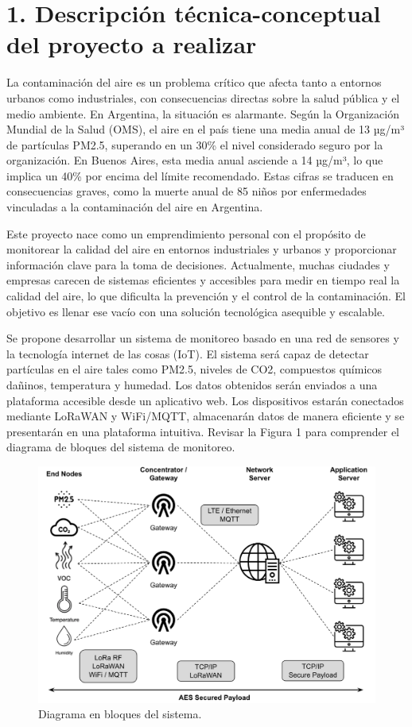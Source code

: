\documentclass[
11pt, %
]{charter}
\begin{document}
\section{1. Descripción técnica-conceptual del proyecto a realizar}
\label{sec:descripcion}

La contaminación del aire es un problema crítico que afecta tanto a entornos urbanos como industriales, con consecuencias directas sobre la salud pública y el medio ambiente. En Argentina, la situación es alarmante. Según la Organización Mundial de la Salud (OMS), el aire en el país tiene una media anual de 13 µg/m³ de partículas PM2.5, superando en un 30\% el nivel considerado seguro por la organización. En Buenos Aires, esta media anual asciende a 14 µg/m³, lo que implica un 40\% por encima del límite recomendado. Estas cifras se traducen en consecuencias graves, como la muerte anual de 85 niños por enfermedades vinculadas a la contaminación del aire en Argentina.

Este proyecto nace como un emprendimiento personal con el propósito de monitorear la calidad del aire en entornos industriales y urbanos y proporcionar información clave para la toma de decisiones. Actualmente, muchas ciudades y empresas carecen de sistemas eficientes y accesibles para medir en tiempo real la calidad del aire, lo que dificulta la prevención y el control de la contaminación. El objetivo es llenar ese vacío con una solución tecnológica asequible y escalable.

Se propone desarrollar un sistema de monitoreo basado en una red de sensores y la tecnología internet de las cosas (IoT). El sistema será capaz de detectar partículas en el aire tales como PM2.5, niveles de CO2, compuestos químicos dañinos, temperatura y humedad. Los datos obtenidos serán enviados a una plataforma accesible desde un aplicativo web. Los dispositivos estarán conectados mediante LoRaWAN y WiFi/MQTT, almacenarán datos de manera eficiente y se presentarán en una plataforma intuitiva. Revisar la Figura 1 para comprender el diagrama de bloques del sistema de monitoreo.

\begin{figure}[htpb]
\centering 
\includegraphics[width=.65\textwidth]{./Figuras/fig_1-diagBloques.png}
\caption{Diagrama en bloques del sistema.}
\label{fig:diagBloques}
\end{figure}
\end{document}
